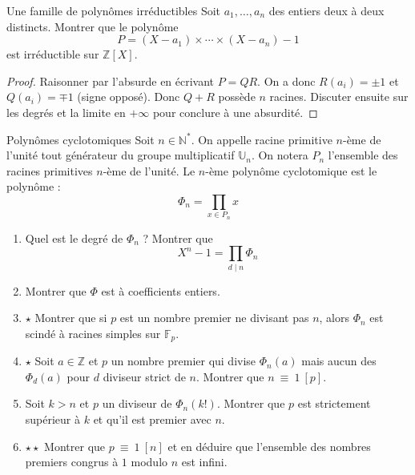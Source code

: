 \documentclass[french,a4paper]{article}
\newcommand{\N}{\mathbb{N}}
\newcommand{\Z}{\mathbb{Z}}
\newcommand{\U}{\mathbb{U}}
\newcommand{\st}{^*}
\newcommand{\F}{\mathbb{F}}
\theoremstyle{plain}
\theoremstyle{definition}
\theoremstyle{remark}
\begin{document}
\begin{ex}[Morlot]{Une famille de polynômes irréductibles}
	Soit $a_1,\ldots,a_n$ des entiers deux à deux distincts. Montrer que le polynôme $$P=(X-a_1)\times\cdots\times(X-a_n)-1$$ est irréductible sur $\Z[X]$.
\end{ex}
\begin{proof}
	Raisonner par l'absurde en écrivant $P=QR$. On a donc $R(a_i)=\pm 1$ et $Q(a_i)=\mp 1$ (signe opposé). Donc $Q+R$ possède $n$ racines. Discuter ensuite sur les degrés et la limite en $+\infty$ pour conclure à une absurdité.
\end{proof}

\begin{ex}[Révisions]{Polynômes cyclotomiques}
	Soit $n\in\N\st$. On appelle racine primitive $n$-ème de l'unité tout générateur du groupe multiplicatif $\U_n$. On notera $P_n$ l'ensemble des racines primitives $n$-ème de l'unité. Le $n$-ème polynôme cyclotomique est le polynôme : $$\Phi_n=\prod_{x\in P_n}x$$
	\begin{enumerate}
		\item Quel est le degré de $\Phi_n$ ? Montrer que $$X^n-1=\prod_{d\mid n}\Phi_n$$
		\item Montrer que $\Phi$ est à coefficients entiers.
		\item $\star$ Montrer que si $p$ est un nombre premier ne divisant pas $n$, alors $\Phi_n$ est scindé à racines simples sur $\F_p$. 
		\item $\star$ Soit $a\in\Z$ et $p$ un nombre premier qui divise $\Phi_n(a)$ mais aucun des $\Phi_d(a)$ pour $d$ diviseur strict de $n$. Montrer que $n\ \equiv\ 1\ [p]$.
		\item Soit $k>n$ et $p$ un diviseur de $\Phi_n(k!)$. Montrer que $p$ est strictement supérieur à $k$ et qu'il est premier avec $n$.
		\item $\star\star$ Montrer que $p\ \equiv\ 1\ [n]$ et en déduire que l'ensemble des nombres premiers congrus à $1$ modulo $n$ est infini.
	\end{enumerate}
\end{ex}
\end{document}
